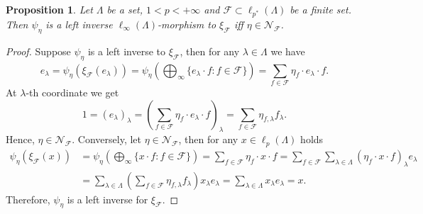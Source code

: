 \documentclass[12pt]{article}
\newtheorem{proposition}[theorem]{Proposition}
\begin{document}
\begin{proposition}\label{StdEmbdLeftInvCharac}
    Let $\Lambda$ be a set, $1<p<+\infty$ 
    and $\mathcal{F}\subset\ell_{p^*}(\Lambda)$ be a finite set. 
    Then $\psi_\eta$ is a left inverse $\ell_\infty(\Lambda)$-morphism 
    to $\xi_{\mathcal{F}}$ iff $\eta\in\mathcal{N}_{\mathcal{F}}$.
\end{proposition}
\begin{proof} 
    Suppose $\psi_{\eta}$ is a left inverse to $\xi_{\mathcal{F}}$, then
    for any $\lambda\in\Lambda$ we have
    \[
        e_\lambda
        =\psi_{\eta}(\xi_{\mathcal{F}}(e_\lambda))
        =\psi_{\eta}\left(\bigoplus_\infty\{
            e_\lambda\cdot f: f\in\mathcal{F}
        \}\right)
        =\sum_{f\in\mathcal{F}} \eta_{f}\cdot e_\lambda\cdot f.
    \]
    At $\lambda$-th coordinate  we get
    \[
        1=(e_\lambda)_\lambda
        =\left(
            \sum_{f\in\mathcal{F}} \eta_f\cdot e_\lambda\cdot f
        \right)_\lambda
        =\sum_{f\in\mathcal{F}} \eta_{f,\lambda}f_\lambda.
    \]
    Hence, $\eta\in\mathcal{N}_{\mathcal{F}}$.
    Conversely, let $\eta\in\mathcal{N}_{\mathcal{F}}$, then for 
    any $x\in\ell_p(\Lambda)$ holds
    \[
    \begin{aligned}
        \psi_\eta(\xi_{\mathcal{F}}(x))
        &=\psi_{\eta}\left(\bigoplus_\infty\{x\cdot f:f\in\mathcal{F}\}\right) 
        =\sum_{f\in\mathcal{F}}\eta_f\cdot x\cdot f 
        =\sum_{f\in\mathcal{F}}\sum_{\lambda\in\Lambda} 
            (\eta_f\cdot x\cdot f)_\lambda e_\lambda \\
        &=\sum_{\lambda\in\Lambda} 
            \left(\sum_{f\in\mathcal{F}}\eta_{f,\lambda}f_\lambda\right) 
            x_\lambda e_\lambda 
        =\sum_{\lambda\in\Lambda} x_\lambda e_\lambda 
        =x. 
    \end{aligned}
    \]
    Therefore, $\psi_\eta$ is a left inverse for $\xi_{\mathcal{F}}$.
\end{proof}
\end{document}
